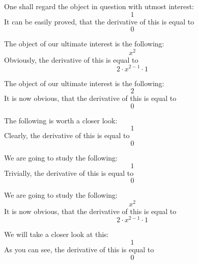 \documentclass{article}
\begin{document}
One shall regard the object in question with utmost interest:
\begin{equation}
1 
\end{equation}
It can be easily proved, that the derivative of this is equal to
\begin{equation}
0 
\end{equation}

The object of our ultimate interest is the following:
\begin{equation}
x ^{2 } 
\end{equation}
Obviously, the derivative of this is equal to
\begin{equation}
2 \cdot x ^{2 - 1 } \cdot 1 
\end{equation}

The object of our ultimate interest is the following:
\begin{equation}
2 
\end{equation}
It is now obvious, that the derivative of this is equal to
\begin{equation}
0 
\end{equation}

The following is worth a closer look:
\begin{equation}
1 
\end{equation}
Clearly, the derivative of this is equal to
\begin{equation}
0 
\end{equation}

We are going to study the following:
\begin{equation}
1 
\end{equation}
Trivially, the derivative of this is equal to
\begin{equation}
0 
\end{equation}

We are going to study the following:
\begin{equation}
x ^{2 } 
\end{equation}
It is now obvious, that the derivative of this is equal to
\begin{equation}
2 \cdot x ^{2 - 1 } \cdot 1 
\end{equation}

We will take a closer look at this:
\begin{equation}
1 
\end{equation}
As you can see, the derivative of this is equal to
\begin{equation}
0 
\end{equation}
\end{document}
